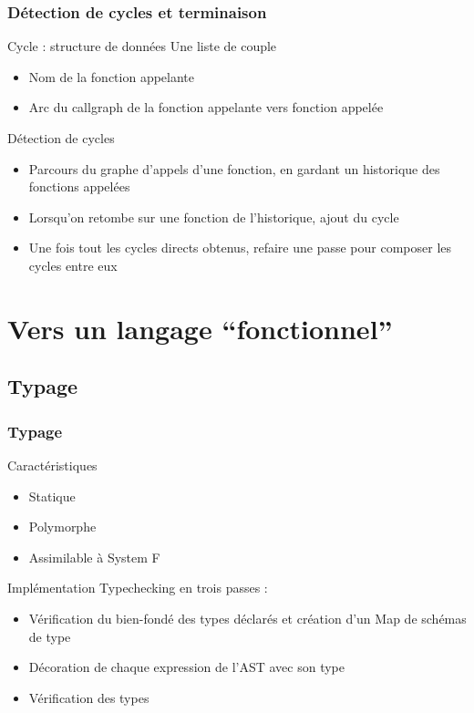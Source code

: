 \begin{frame}
  \frametitle{Détection de cycles et terminaison}
  \begin{block}{Cycle : structure de données}
    Une liste de couple
    \begin{itemize}
    \item Nom de la fonction appelante 
    \item Arc du callgraph de la fonction appelante vers fonction appelée
    \end{itemize}
  \end{block}
  \begin{block}{Détection de cycles}
    \begin{itemize}
    \item Parcours du graphe d'appels d'une fonction, en gardant un
      historique des fonctions appelées
    \item Lorsqu'on retombe sur une fonction de l'historique, ajout du
      cycle
    \item Une fois tout les cycles directs obtenus, refaire une passe
      pour composer les cycles entre eux
    \end{itemize}
  \end{block}
\end{frame}

\section{Vers un langage ``fonctionnel''}

\subsection{Typage}

\begin{frame}
  \frametitle{Typage}
  \begin{block}{Caractéristiques}
    \begin{itemize}
    \item Statique
    \item Polymorphe
    \item Assimilable à System F
    \end{itemize}
  \end{block}
  \begin{block}{Implémentation}
    Typechecking en trois passes :
    \begin{itemize}
      \item Vérification du bien-fondé des types déclarés et création d'un Map de schémas de type
      \item Décoration de chaque expression de l'AST avec son type
      \item Vérification des types
    \end{itemize}
  \end{block}
\end{frame}

